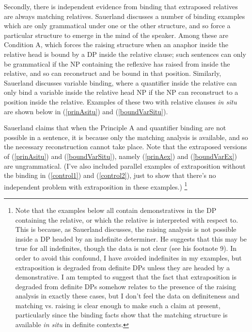Secondly, there is independent evidence from binding that extraposed relatives are always matching relatives. Sauerland discusses a number of binding examples which are only grammatical under one or the other structure, and so force a particular structure to emerge in the mind of the speaker. Among these are Condition A, which forces the raising structure when an anaphor inside the relative head is bound by a DP inside the relative clause; such sentences can only be grammatical if the NP containing the reflexive has raised from inside the relative, and so can reconstruct and be bound in that position. Similarly, Sauerland discusses variable binding, where a quantifier inside the relative can only bind a variable inside the relative head NP if the NP can reconstruct to a position inside the relative. Examples of these two with relative clauses \textsl{in situ} are shown below in (\ref{prinAsitu}) and (\ref{boundVarSitu}). 

Sauerland claims that when the Principle A and quantifier binding are not possible in a sentence, it is because only the matching analysis is available, and so the necessary reconstruction cannot take place. Note that the extraposed versions of (\ref{prinAsitu}) and (\ref{boundVarSitu}), namely (\ref{prinAex}) and (\ref{boundVarEx}) are ungrammatical. (I've also included parallel examples of extraposition without the binding in (\ref{control1}) and (\ref{control2}), just to show that there's no independent problem with extraposition in these examples.) \footnote{Note that the examples below all contain demonstratives in the DP containing the relative, or which the relative is interpreted with respect to. This is because, as Sauerland discusses, the raising analysis is not possible inside a DP headed by an indefinite determiner. He suggests that this may be true for all indefinites, though the data is not clear (see his footnote 9). In order to avoid this confound, I have avoided indefinites in my examples, but extraposition is degraded from definite DPs \citep[][and references therein]{baltin2006} unless they are headed by a demonstrative. I am tempted to suggest that the fact that extraposition is degraded from definite DPs somehow relates to the presence of the raising analysis in exactly these cases, but I don't feel the data on definiteness and matching vs. raising is clear enough to make such a claim at present, particularly since the binding facts show that the matching structure is available \textsl{in situ} in definite contexts.}

